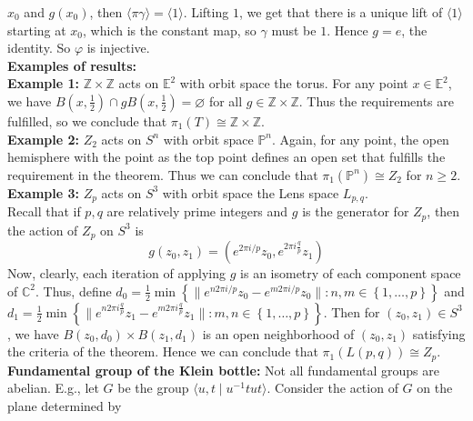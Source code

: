 \documentclass[a4paper]{article}
\begin{document}
 $x_0$ and $g(x_0)$, then
 $\langle \pi \gamma \rangle = \langle 1 \rangle $. Lifting
 $1$, we get that there is a unique lift of $\langle 1 \rangle $ starting at
 $x_0$, which is the constant map, so $\gamma$ must be $1$. Hence
 $g = e$, the identity. So $\varphi$ is injective.\\
 \linebreak
 \textbf{Examples of results:}\\
 \textbf{Example 1:} $\mathbb{Z} \times \mathbb{Z}$ acts
 on $\mathbb{E}^2$ with orbit space the torus. For any point
 $x \in \mathbb{E}^2$, we have
 $B(x, \frac{1}{2}) \cap g B\left( x, \frac{1}{2} \right) = \varnothing$ for
 all
 $g \in \mathbb{Z} \times \mathbb{Z}$. Thus the requirements are fulfilled, so
 we conclude that
 $\pi_1 (T) \cong \mathbb{Z} \times \mathbb{Z}$.\\
 \linebreak
 \textbf{Example 2:} $Z_2$ acts on $S^{n}$ with orbit space
 $\mathbb{P}^{n}$. Again, for any point, the open hemisphere with the point as
 the top point defines an open set that fulfills the requirement
 in the theorem. Thus we can conclude that
 $\pi_1 \left( \mathbb{P}^{n} \right) 
 \cong Z_2$ for $n\ge 2$.\\
 \linebreak
 \textbf{Example 3:} $Z_p$ acts on $S^{3}$ with orbit space the Lens space
 $L_{p,q}$.\\
 Recall that if $p,q$ are relatively prime integers and $g$ is the generator for $Z_p$,
 then the action of
 $Z_p$ on $S^3$ is
 \[
 g(z_0, z_1) = \left( e^{2\pi i /p}z_0, e^{2\pi i \frac{q}{p}} z_1 \right) 
 \] 
 Now, clearly, each iteration of applying $g$ is an isometry of each
 component space of $\mathbb{C}^2$. Thus, define
 $d_0 =\frac{1}{2} \min \left\{ \|e^{n 2 \pi i /p}z_0 - e^{m 2 \pi i /p}z_0 \|  \colon
n,m \in \left\{ 1, \ldots, p \right\} \right\} $ and
$d_1 = \frac{1}{2} \min \left\{ \|e^{n 2\pi i \frac{q}{p}}z_1 - 
e^{m 2 \pi i \frac{q}{p}} z_1\|  \colon m,n 
\in \left\{ 1, \ldots, p \right\} \right\} $. Then
for $(z_0, z_1) \in S^3$, we have
$B(z_0, d_0) \times B(z_1, d_1)$ is an open neighborhood of
$(z_0, z_1)$ satisfying the criteria of the theorem. Hence we can conclude that
$\pi_1 \left( L (p,q) \right) \cong Z_p$.\\
\linebreak
\textbf{Fundamental group of the Klein bottle:} Not all fundamental groups are
abelian. E.g., let $G$ be the group $\langle u,t  \mid u^{-1} t u t \rangle $.
Consider the action of $G$ on the plane determined by
\end{document}
